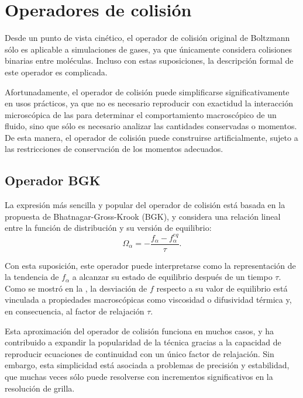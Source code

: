 \section{Operadores de colisi\'on}

Desde un punto de vista cin\'etico, el operador de colisi\'on original de Boltzmann s\'olo es aplicable a simulaciones de gases, ya que \'unicamente considera colisiones binarias entre mol\'eculas. Incluso con estas suposiciones, la descripci\'on formal de este operador es complicada.
\par 
Afortunadamente, el operador de colisi\'on puede simplificarse significativamente en usos pr\'acticos, ya que no es necesario reproducir con exactidud la interacci\'on microsc\'opica de las \fdp{} para determinar el comportamiento macrosc\'opico de un fluido, sino que s\'olo es necesario analizar las cantidades conservadas o momentos. De esta manera, el operador de colisi\'on puede construirse artificialmente, sujeto a las restricciones de conservaci\'on de los momentos adecuados.


\subsection{Operador BGK}

La expresi\'on m\'as sencilla y popular del operador de colisi\'on est\'a basada en la propuesta de Bhatnagar-Gross-Krook (BGK), y considera una relaci\'on lineal entre la funci\'on de distribuci\'on y su versi\'on de equilibrio:
\begin{equation}
	\Omega_{\alpha} = -\dfrac{f_{\alpha} - f_{\alpha}^{eq}}{\tau}.
\end{equation}

Con esta suposici\'on, este operador puede interpretarse como la representaci\'on de la tendencia de $f_{\alpha}$ a alcanzar su estado de equilibrio despu\'es de un tiempo $\tau$. Como se mostr\'o en la , la desviaci\'on de $f$ respecto a su valor de equilibrio est\'a vinculada a propiedades macrosc\'opicas como viscosidad o difusividad t\'ermica y, en consecuencia, al factor de relajaci\'on $\tau$.

Esta aproximaci\'on del operador de colisi\'on funciona en muchos casos, y ha contribuido a expandir la popularidad de la t\'ecnica gracias a la capacidad de reproducir ecuaciones de continuidad con un \'unico factor de relajaci\'on. Sin embargo, esta simplicidad  est\'a asociada a problemas de precisi\'on y estabilidad, que muchas veces s\'olo puede resolverse con incrementos significativos en la resoluci\'on de grilla.


